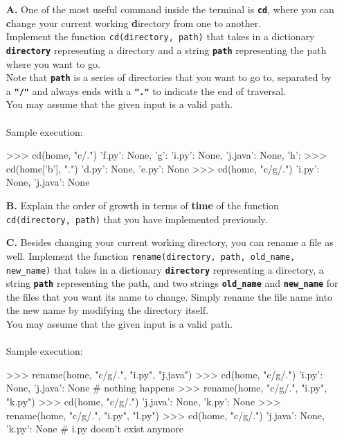 \begin{enumerate}
\item[\textbf{A.}]
One of the most useful command inside the terminal is \texttt{\bfseries cd}, where you can \textbf{c}hange your 
current working \textbf{d}irectory from one to another. \\
Implement the function \colorbox{CornflowerBlue!20}{\texttt{cd(directory, path)}} that takes in a dictionary 
\texttt{\bfseries directory} representing a directory and a string \texttt{\bfseries path} representing the path 
where you want to go. \\
Note that \texttt{\bfseries path} is a series of directories that you want to go to, separated by a \texttt{\bfseries "/"} 
and always ends with a \texttt{\bfseries "."} to indicate the end of traversal. \\
You may assume that the given input is a valid path. \\ \\
Sample execution:
\begin{python}
>>> cd(home, "c/.")
{'f.py': None, 'g': {'i.py': None, 'j.java': None}, 'h': {}}
>>> cd(home['b'], ".")
{'d.py': None, 'e.py': None}
>>> cd(home, "c/g/.")
{'i.py': None, 'j.java': None}
\end{python}
\begin{flushright}
    [4 marks]
\end{flushright}

\item[\textbf{B.}]
Explain the order of growth in terms of \textbf{time} of the function \colorbox{CornflowerBlue!20}{\texttt{cd(directory, path)}} that 
you have implemented previously.
\begin{flushright}
    [2 marks]
\end{flushright}

\item[\textbf{C.}]
Besides changing your current working directory, you can rename a file as well. Implement the function 
\colorbox{CornflowerBlue!20}{\texttt{rename(directory, path, old\_name, new\_name)}} that takes in a dictionary \texttt{\bfseries directory} representing a directory, 
a string \texttt{\bfseries path} representing the path, and two strings \texttt{\bfseries old\_name} and \texttt{\bfseries new\_name} for the files that you want its 
name to change. Simply rename the file name into the new name by modifying the directory itself. \\
You may assume that the given input is a valid path. \\ \\
Sample execution:
\begin{python}
>>> rename(home, "c/g/.", "i.py", "j.java")
>>> cd(home, "c/g/.")
{'i.py': None, 'j.java': None} # nothing happens
>>> rename(home, "c/g/.", "i.py", "k.py")
>>> cd(home, "c/g/.")
{'j.java': None, 'k.py': None}
>>> rename(home, "c/g/.", "i.py", "l.py")
>>> cd(home, "c/g/.")
{'j.java': None, 'k.py': None} # i.py doesn't exist anymore
\end{python}
\begin{flushright}
    [5 marks]
\end{flushright}


\end{enumerate}
